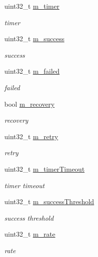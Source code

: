 \begin{DoxyCompactItemize}
\item 
uint32\+\_\+t \hyperlink{structns3_1_1AarfWifiRemoteStation_a4c0ee414a7238d8ae64513534300ba5a}{m\+\_\+timer}
\begin{DoxyCompactList}\small\item\em timer \end{DoxyCompactList}\item 
uint32\+\_\+t \hyperlink{structns3_1_1AarfWifiRemoteStation_a0cfd902eb4ef3948e1983a5eb8c98530}{m\+\_\+success}
\begin{DoxyCompactList}\small\item\em success \end{DoxyCompactList}\item 
uint32\+\_\+t \hyperlink{structns3_1_1AarfWifiRemoteStation_a7d2ddc46352742070b573798c3ace997}{m\+\_\+failed}
\begin{DoxyCompactList}\small\item\em failed \end{DoxyCompactList}\item 
bool \hyperlink{structns3_1_1AarfWifiRemoteStation_a0e32429b6e0ef2f93940f8d3113b0cf0}{m\+\_\+recovery}
\begin{DoxyCompactList}\small\item\em recovery \end{DoxyCompactList}\item 
uint32\+\_\+t \hyperlink{structns3_1_1AarfWifiRemoteStation_aced8fb87c251a20d4d3a3ab5e5fc2f8e}{m\+\_\+retry}
\begin{DoxyCompactList}\small\item\em retry \end{DoxyCompactList}\item 
uint32\+\_\+t \hyperlink{structns3_1_1AarfWifiRemoteStation_a9443b93f52a3894b4f801d60df68fe39}{m\+\_\+timer\+Timeout}
\begin{DoxyCompactList}\small\item\em timer timeout \end{DoxyCompactList}\item 
uint32\+\_\+t \hyperlink{structns3_1_1AarfWifiRemoteStation_ac215e2c0223a8e1eae00ed67a9833519}{m\+\_\+success\+Threshold}
\begin{DoxyCompactList}\small\item\em success threshold \end{DoxyCompactList}\item 
uint32\+\_\+t \hyperlink{structns3_1_1AarfWifiRemoteStation_aa5ecd8dd5aef8dbad45a90a6d49be72d}{m\+\_\+rate}
\begin{DoxyCompactList}\small\item\em rate \end{DoxyCompactList}\end{DoxyCompactItemize}
